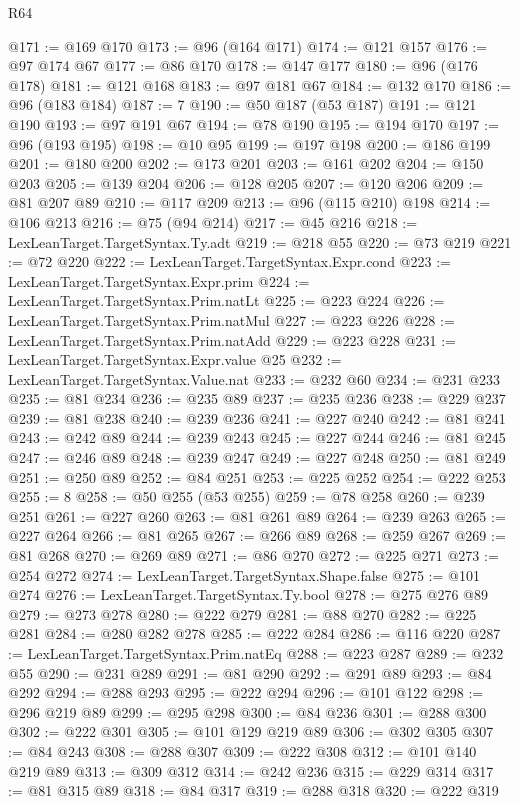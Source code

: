 \begin{lexlean}{R64}
\begin{coremodule}
@171 := @169 @170
@173 := @96 (@164 @171)
@174 := @121 @157
@176 := @97 @174 @67
@177 := @86 @170
@178 := @147 @177
@180 := @96 (@176 @178)
@181 := @121 @168
@183 := @97 @181 @67
@184 := @132 @170
@186 := @96 (@183 @184)
@187 := 7
@190 := @50 @187 (@53 @187)
@191 := @121 @190
@193 := @97 @191 @67
@194 := @78 @190
@195 := @194 @170
@197 := @96 (@193 @195)
@198 := @10 @95
@199 := @197 @198
@200 := @186 @199
@201 := @180 @200
@202 := @173 @201
@203 := @161 @202
@204 := @150 @203
@205 := @139 @204
@206 := @128 @205
@207 := @120 @206
@209 := @81 @207 @89
@210 := @117 @209
@213 := @96 (@115 @210) @198
@214 := @106 @213
@216 := @75 (@94 @214)
@217 := @45 @216
@218 := LexLeanTarget.TargetSyntax.Ty.adt
@219 := @218 @55
@220 := @73 @219
@221 := @72 @220
@222 := LexLeanTarget.TargetSyntax.Expr.cond
@223 := LexLeanTarget.TargetSyntax.Expr.prim
@224 := LexLeanTarget.TargetSyntax.Prim.natLt
@225 := @223 @224
@226 := LexLeanTarget.TargetSyntax.Prim.natMul
@227 := @223 @226
@228 := LexLeanTarget.TargetSyntax.Prim.natAdd
@229 := @223 @228
@231 := LexLeanTarget.TargetSyntax.Expr.value @25
@232 := LexLeanTarget.TargetSyntax.Value.nat
@233 := @232 @60
@234 := @231 @233
@235 := @81 @234
@236 := @235 @89
@237 := @235 @236
@238 := @229 @237
@239 := @81 @238
@240 := @239 @236
@241 := @227 @240
@242 := @81 @241
@243 := @242 @89
@244 := @239 @243
@245 := @227 @244
@246 := @81 @245
@247 := @246 @89
@248 := @239 @247
@249 := @227 @248
@250 := @81 @249
@251 := @250 @89
@252 := @84 @251
@253 := @225 @252
@254 := @222 @253
@255 := 8
@258 := @50 @255 (@53 @255)
@259 := @78 @258
@260 := @239 @251
@261 := @227 @260
@263 := @81 @261 @89
@264 := @239 @263
@265 := @227 @264
@266 := @81 @265
@267 := @266 @89
@268 := @259 @267
@269 := @81 @268
@270 := @269 @89
@271 := @86 @270
@272 := @225 @271
@273 := @254 @272
@274 := LexLeanTarget.TargetSyntax.Shape.false
@275 := @101 @274
@276 := LexLeanTarget.TargetSyntax.Ty.bool
@278 := @275 @276 @89
@279 := @273 @278
@280 := @222 @279
@281 := @88 @270
@282 := @225 @281
@284 := @280 @282 @278
@285 := @222 @284
@286 := @116 @220
@287 := LexLeanTarget.TargetSyntax.Prim.natEq
@288 := @223 @287
@289 := @232 @55
@290 := @231 @289
@291 := @81 @290
@292 := @291 @89
@293 := @84 @292
@294 := @288 @293
@295 := @222 @294
@296 := @101 @122
@298 := @296 @219 @89
@299 := @295 @298
@300 := @84 @236
@301 := @288 @300
@302 := @222 @301
@305 := @101 @129 @219 @89
@306 := @302 @305
@307 := @84 @243
@308 := @288 @307
@309 := @222 @308
@312 := @101 @140 @219 @89
@313 := @309 @312
@314 := @242 @236
@315 := @229 @314
@317 := @81 @315 @89
@318 := @84 @317
@319 := @288 @318
@320 := @222 @319

\end{coremodule}
\end{lexlean}
